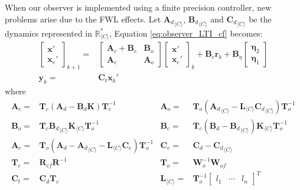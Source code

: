 \documentclass[sigconf]{llncs}
\newcommand{\mat}[1]{\boldsymbol{#1}}
\renewcommand{\vec}[1]{\boldsymbol{#1}}
\begin{document}
When our observer is implemented using a finite precision controller, new
problems arise due to the FWL effects.  Let ${\mat{A}_d}_{\langle C
\rangle}$, ${\mat{B}_d}_{\langle C \rangle}$ and ${\mat{C}_d}_{\langle C
\rangle}$ be the dynamics represented in $\mathbb{R}_{\langle C\rangle}^*$,
%
Equation \eqref{eq:observer_LTI_cf} becomes:
%
\begin{align}
\left [\begin{array}{c}\vec{x}'\\ \vec{x}_e' \end{array}\right]_{k+1}
=& \left [\begin{array}{cc}\mat{A}_{c}+\mat{B}_{e}&\mat{B}_{o}\\ \mat{A}_{e}&\mat{A}_{o}\end{array}\right]
\left [\begin{array}{c}\vec{x}'\\ \vec{x}_e' \end{array}\right]_k
+\mat{B}_{c} \vec{r}_k
+\mat{B}_{\eta}\left [\begin{array}{c}\vec{\eta}_2\\ \vec{\eta}_1\end{array}\right]\nonumber\\
\vec{y}_k=&\mat{C}_{t}\vec{x}_k'%
\label{eq:observer_LTI_FWL_cf}
\end{align}
where
{\setlength{\abovedisplayskip}{2pt}
\setlength{\belowdisplayskip}{2pt}
\begin{align*}
\mat{A}_{c}=&\mat{T}_c\left(\mat{A}_d-\mat{B}_d\mat{K}\right)\mat{T}_c^{-1}&
\mat{A}_{o}=&\mat{T}_o\left({\mat{A}_d}_{\langle C \rangle}-\mat{L}_{\langle C \rangle}{\mat{C}_d}_{\langle C \rangle}\right)\mat{T}_o^{-1}\\
\mat{B}_{o}=&\mat{T}_c{\mat{B}_d}_{\langle C \rangle}\mat{K}_{\langle C \rangle}\mat{T}_o^{-1}&
\mat{B}_{e}=&\mat{T}_c(\mat{B}_d-{\mat{B}_d}_{\langle C \rangle})\mat{K}_{\langle C \rangle}\mat{T}_o^{-1}\\
\mat{A}_{e}=&\mat{T}_o\left(\mat{A}_d-{\mat{A}_d}_{\langle C \rangle}-\mat{L}_{\langle C \rangle}\mat{C}_e\right)\mat{T}_o^{-1}&
\mat{C}_{e}=&\mat{C}_d-{\mat{C}_d}_{\langle C \rangle}\\
\mat{T}_c=&\mat{R}_{cf}\mat{R}^{-1}&
\mat{T}_o=&\mat{W}_o^{-1}\mat{W}_{of}\\
\mat{C}_t=&\mat{C}_d\mat{T}_c&
\mat{L}_{\langle C \rangle}=& \mat{T}_o^{-1}\left[ \begin{array}{ccc}l_1&\cdots&l_n\end{array}\right]^T
\end{align*}
}
\end{document}
